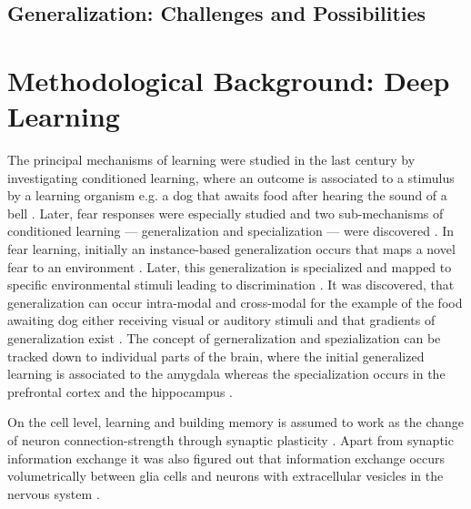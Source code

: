     \subsection{Generalization: Challenges and Possibilities} %


\section{Methodological Background: Deep Learning} %
    The principal mechanisms of learning were studied in the last century by investigating conditioned learning, where an outcome is associated to a stimulus by a learning organism e.g. a dog that awaits food after hearing the sound of a bell \citep{pavlov1928conditioned, pavlov2010conditioned, banich2011generalization}. Later, fear responses were especially studied and two sub-mechanisms of conditioned learning --- generalization and specialization --- were discovered \citep{banich2011generalization}.
    In fear learning, initially an instance-based generalization occurs that maps a novel fear to an environment \citep{banich2011generalization}. Later, this generalization is specialized and mapped to specific environmental stimuli leading to discrimination \citep{banich2011generalization}.
    It was discovered, that generalization can occur intra-modal and cross-modal for the example of the food awaiting dog either receiving visual or auditory stimuli \citep{pavlov1928conditioned} and that gradients of generalization exist \citep{guttman1956discriminability}.
    The concept of gerneralization and spezialization can be tracked down to individual parts of the brain, where the initial generalized learning is associated to the amygdala whereas the specialization occurs in the prefrontal cortex and the hippocampus \citep{banich2011generalization}.

    On the cell level, learning and building memory is assumed to work as the change of neuron connection-strength through synaptic plasticity \citep{do1949organization,martin2000synaptic}. Apart from synaptic information exchange it was also figured out that information exchange occurs volumetrically between glia cells and neurons with extracellular vesicles in the nervous system \citep{schiera2019communcation}.


